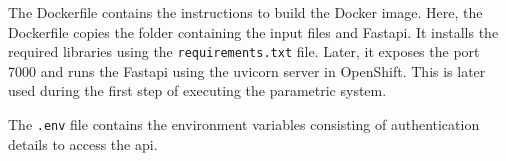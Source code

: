 The Dockerfile contains the instructions to build the Docker image. Here, the Dockerfile copies the folder containing the input files and Fast\acrshort{api}.
It installs the required libraries using the \texttt{requirements.txt} file. Later, it exposes the port 7000 and runs the Fast\acrshort{api} using the
uvicorn server in OpenShift. This is later used during the first step of executing the parametric system.

The \texttt{.env} file contains the environment variables consisting of authentication details to access the \acrshort{api}. 

